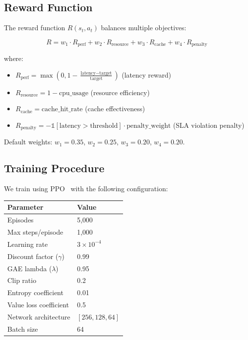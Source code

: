 \documentclass[10pt,twocolumn]{article}
\begin{document}
\subsection{Reward Function}

The reward function $R(s_t, a_t)$ balances multiple objectives:

\begin{equation}
R = w_1 \cdot R_{\text{perf}} + w_2 \cdot R_{\text{resource}} + w_3 \cdot R_{\text{cache}} + w_4 \cdot R_{\text{penalty}}
\end{equation}

where:
\begin{itemize}[nosep]
\item $R_{\text{perf}} = \max(0, 1 - \frac{\text{latency} - \text{target}}{\text{target}})$ (latency reward)
\item $R_{\text{resource}} = 1 - \text{cpu\_usage}$ (resource efficiency)
\item $R_{\text{cache}} = \text{cache\_hit\_rate}$ (cache effectiveness)
\item $R_{\text{penalty}} = -\mathbb{1}[\text{latency} > \text{threshold}] \cdot \text{penalty\_weight}$ (SLA violation penalty)
\end{itemize}

Default weights: $w_1 = 0.35$, $w_2 = 0.25$, $w_3 = 0.20$, $w_4 = 0.20$.

\subsection{Training Procedure}

We train using PPO~\cite{schulman2017ppo} with the following configuration:

\begin{table}[h]
\centering
\small
\begin{tabular}{ll}
\toprule
\textbf{Parameter} & \textbf{Value} \\
\midrule
Episodes & 5,000 \\
Max steps/episode & 1,000 \\
Learning rate & $3 \times 10^{-4}$ \\
Discount factor ($\gamma$) & 0.99 \\
GAE lambda ($\lambda$) & 0.95 \\
Clip ratio & 0.2 \\
Entropy coefficient & 0.01 \\
Value loss coefficient & 0.5 \\
Network architecture & $[256, 128, 64]$ \\
Batch size & 64 \\
\bottomrule
\end{tabular}
\end{table}
\end{document}
